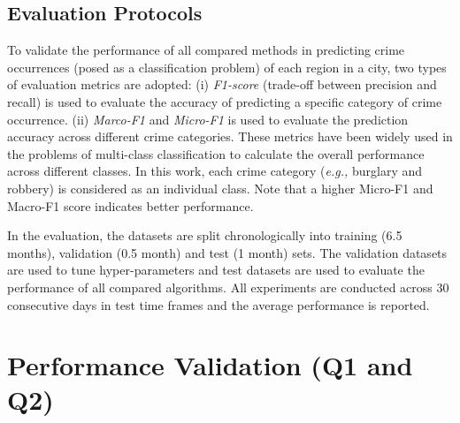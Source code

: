 \subsection{Evaluation Protocols}

To validate the performance of all
compared methods in predicting crime occurrences (posed as a
classification problem) of each region in a city, two types of
evaluation metrics are adopted: (i) \emph{F1-score} (trade-off between precision
and recall) is used to evaluate the accuracy of predicting a specific category
of crime occurrence. (ii) \emph{Marco-F1} and \emph{Micro-F1} is used to
evaluate the prediction accuracy across different crime categories.
These metrics have been widely used in the problems of multi-class
classification to calculate the overall performance across different
classes. In this work, each crime category (\emph{e.g.,} burglary
and robbery) is considered as an individual class. Note that a higher Micro-F1
and Macro-F1 score indicates better performance.

In the evaluation, the datasets are split chronologically into
training (6.5 months), validation (0.5 month) and test (1 month)
sets. The validation datasets are used to tune hyper-parameters and
test datasets are used to evaluate the performance of all compared algorithms. All experiments are conducted across 30 consecutive
days in test time frames and the average performance is reported.

\section{Performance Validation (Q1 and Q2)}


